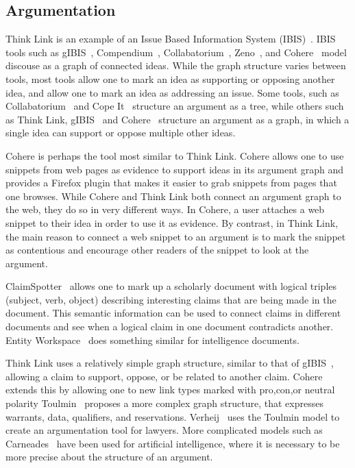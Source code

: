 \documentclass{chi2009}
\begin{document}
\subsection{Argumentation}

Think Link is an example of an Issue Based Information System (IBIS)~\cite{Rittel1973}. IBIS tools such as gIBIS~\cite{Conklin1987a}, Compendium~\cite{Selvin2001}, Collabatorium~\cite{Klein2007}, Zeno~\cite{Gordon1996}, and Cohere~\cite{Shum2008} model discouse as a graph of connected ideas. While the graph structure varies between tools, most tools allow one to mark an idea as supporting or opposing another idea, and allow one to mark an idea as addressing an issue. Some tools, such as Collabatorium~\cite{Klein2007} and Cope It~\cite{Karacapilidis2001} structure an argument as a tree, while others such as Think Link, gIBIS~\cite{Conklin1987a} and Cohere~\cite{Shum2008} structure an argument as a graph, in which a single idea can support or oppose multiple other ideas.

Cohere is perhaps the tool most similar to Think Link. Cohere allows one to use snippets from web pages as evidence to support ideas in its argument graph and provides a Firefox plugin that makes it easier to grab snippets from pages that one browses. While Cohere and Think Link both connect an argument graph to the web, they do so in very different ways. In Cohere, a user attaches a web snippet to their idea in order to use it as evidence. By contrast, in Think Link, the main reason to connect a web snippet to an argument is to mark the snippet as contentious and encourage other readers of the snippet to look at the argument. 

ClaimSpotter~\cite{Sereno2005,Sereno2004} allows one to mark up a scholarly document with logical triples (subject, verb, object) describing interesting claims that are being made in the document. This semantic information can be used to connect claims in different documents and see when a logical claim in one document contradicts another. Entity Workspace~\cite{Bier2006} does something similar for intelligence documents.  

Think Link uses a relatively simple graph structure, similar to that of gIBIS~\cite{Conklink1987a}, allowing a claim to support, oppose, or be related to another claim. Cohere~\cite{Shum2008} extends this by allowing one to new link types marked with pro,con,or neutral polarity Toulmin~\cite{toulmin1958} proposes a more complex graph structure, that expresses warrants, data, qualifiers, and reservations. Verheij~\cite{Verheij1999} uses the Toulmin model to create an argumentation tool for lawyers. More complicated models such as Carneades~\cite{Gordon2007} have been used for artificial intelligence, where it is necessary to be more precise about the structure of an argument.
\end{document}
